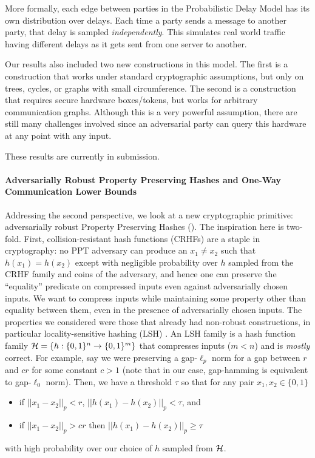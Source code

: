 \begin{itemize}
	More formally, each edge between parties in the Probabilistic Delay Model has its own distribution over delays. Each time a party sends a message to another party, that delay is sampled \emph{independently}. This simulates real world traffic having different delays as it gets sent from one server to another.
	
	Our results also included two new constructions in this model. The first is a construction that works under standard cryptographic assumptions, but only on trees, cycles, or graphs with small circumference. The second is a construction that requires secure hardware boxes/tokens, but works for arbitrary communication graphs. Although this is a very powerful assumption, there are still many challenges involved since an adversarial party can query this hardware at any point with any input.
	
	These results are currently in submission.
\end{itemize}

\paragraph{Adversarially Robust Property Preserving Hashes and One-Way Communication Lower Bounds}
Addressing the second perspective, we look at a new cryptographic primitive: adversarially robust Property Preserving Hashes (\PPH). The inspiration here is two-fold. First, collision-resistant hash functions (CRHFs) are a staple in cryptography: no PPT adversary can produce an $x_1 \neq x_2$ such that $h(x_1) = h(x_2)$ except with negligible probability over $h$ sampled from the CRHF family and coins of the adversary, and hence one can preserve the ``equality'' predicate on compressed inputs even against adversarially chosen inputs. We want to compress inputs while maintaining some property other than equality between them, even in the presence of adversarially chosen inputs. The properties we considered were those that already had non-robust constructions, in particular locality-sensitive hashing (LSH) \cite{IndykM98}. An LSH family is a hash function family ${\cal H} = \{ h:\{0,1\}^n \to \{0,1\}^m \}$ that compresses inputs ($m < n$) and is \emph{mostly} correct. For example, say we were preserving a gap-$\ell_p$ norm for a gap between $r$ and $cr$ for some constant $c > 1$ (note that in our case, gap-hamming is equivalent to gap-$\ell_0$ norm). Then, we have a threshold $\tau$ so that for any pair $x_1, x_2 \in \{0,1\}$
\begin{itemize}
	\item if $||x_1 - x_2||_p < r$, $||h(x_1) - h(x_2)||_p < \tau$, and
	\item if $||x_1 - x_2||_p > cr$ then $||h(x_1) - h(x_2)||_p \ge \tau$
\end{itemize}
with high probability over our choice of $h$ sampled from ${\cal H}$.

